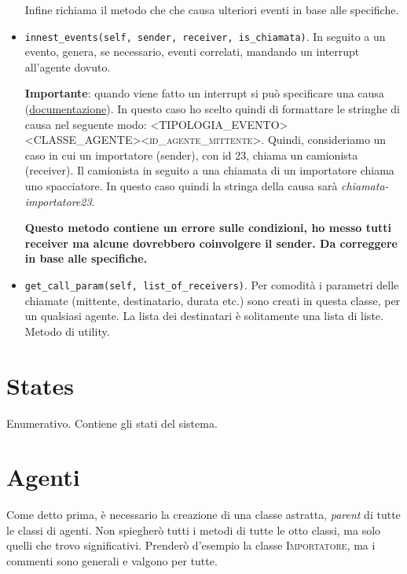 \documentclass{article}
\begin{document}
\begin{itemize}
    Infine richiama il metodo che che causa ulteriori eventi in base alle specifiche.
    
    \item \texttt{innest_events(self, sender, receiver, is_chiamata)}. In seguito a un evento, genera, se necessario, eventi correlati, mandando un interrupt all'agente dovuto. 
    
    \textbf{Importante}: quando viene fatto un interrupt si può specificare una causa (\href{https://simpy.readthedocs.io/en/latest/api_reference/simpy.exceptions.html}{documentazione}). In questo caso ho scelto quindi di formattare le stringhe di causa nel seguente modo: \textsc{<TIPOLOGIA\_EVENTO>\-<CLASSE\_AGENTE><id\_agente\_mittente>}. Quindi, consideriamo un caso in cui un importatore (sender), con id 23, chiama un camionista (receiver). Il camionista in seguito a una chiamata di un importatore chiama uno spacciatore. In questo caso quindi la stringa della causa sarà \textit{chiamata-importatore23}.
    
    \textbf{Questo metodo contiene un errore sulle condizioni, ho messo tutti receiver ma alcune dovrebbero coinvolgere il sender. Da correggere in base alle specifiche.}
    
    \item \texttt{get_call_param(self, list_of_receivers)}. Per comodità i parametri delle chiamate (mittente, destinatario, durata etc.) sono creati in questa classe, per un qualsiasi agente. La lista dei destinatari è solitamente una lista di liste.  Metodo di utility.
    
    
\end{itemize}
 
\section{States}
    Enumerativo. Contiene gli stati del sistema.
    
\section{Agenti}

Come detto prima, è necessario la creazione di una classe astratta, \textit{parent} di tutte le classi di agenti. Non spiegherò tutti i metodi di tutte le otto classi, ma solo quelli che trovo significativi. Prenderò d'esempio la classe \textsc{Importatore}, ma i commenti sono generali e valgono per tutte.
\end{document}

